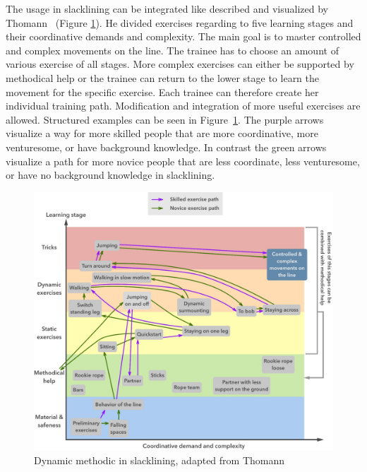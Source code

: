 The usage in slacklining can be integrated like described and visualized by Thomann~\cite{Thomann2013-aa} (Figure \ref{fig:3_3_1_dynamicMethod}). He divided exercises regarding to five learning stages and their coordinative demands and complexity. The main goal is to master controlled and complex movements on the line. The trainee has to choose an amount of various exercise of all stages. More complex exercises can either be supported by methodical help or the trainee can return to the lower stage to learn the movement for the specific exercise. Each trainee can therefore create her individual training path. Modification and integration of more useful exercises are allowed. Structured examples can be seen in Figure~\ref{fig:3_3_1_dynamicMethod}. The purple arrows visualize a way for more skilled people that are more coordinative, more venturesome, or have background knowledge. In contrast the green arrows visualize a path for more novice people that are less coordinate, less venturesome, or have no background knowledge in slacklining.
\begin{figure}[htb]
	\centering
	\begin{minipage}[t]{1\linewidth}
		\centering
		\includegraphics[width=1\linewidth]{Pictures/3_3_1_dynamicMethodBoth2}
		\caption{Dynamic methodic in slacklining, adapted from Thomann~\cite{Thomann2013-aa}}
		\label{fig:3_3_1_dynamicMethod}
	\end{minipage}
\end{figure}


